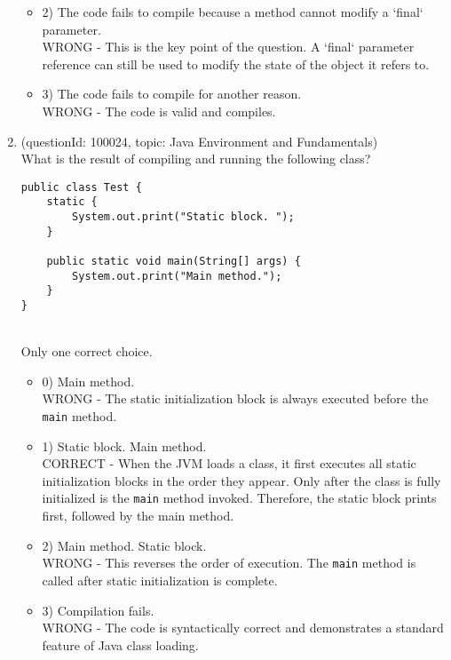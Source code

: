 \documentclass[12pt]{article}
\begin{document}
\begin{enumerate}[label=(\arabic*)]
\begin{itemize}
\item 2) The code fails to compile because a method cannot modify a `final` parameter.
 \\ 
WRONG - This is the key point of the question. A `final` parameter reference can still be used to modify the state of the object it refers to.

\item 3) The code fails to compile for another reason.
 \\ 
WRONG - The code is valid and compiles.

\end{itemize}
\item (questionId: 100024, topic: Java Environment and Fundamentals) \\ 
What is the result of compiling and running the following class?
\begin{verbatim}
public class Test {
    static {
        System.out.print("Static block. ");
    }

    public static void main(String[] args) {
        System.out.print("Main method.");
    }
}
\end{verbatim}
\\ \noindent Only one correct choice. 
\begin{itemize}
\item 0) Main method.
 \\ 
WRONG - The static initialization block is always executed before the \verb|main| method.

\item 1) Static block. Main method.
 \\ 
CORRECT - When the JVM loads a class, it first executes all static initialization blocks in the order they appear. Only after the class is fully initialized is the \verb|main| method invoked. Therefore, the static block prints first, followed by the main method.

\item 2) Main method. Static block.
 \\ 
WRONG - This reverses the order of execution. The \verb|main| method is called after static initialization is complete.

\item 3) Compilation fails.
 \\ 
WRONG - The code is syntactically correct and demonstrates a standard feature of Java class loading.


\end{itemize}
\end{enumerate}
\end{document}
